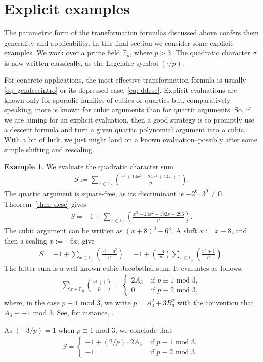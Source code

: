 \documentclass[11pt]{amsart}
\newcommand{\F}{\mathbb{F}}
\newcommand{\Fp}{\F_{\!p}}
\theoremstyle{definition}
\newtheorem{ex}{Example}[section]
\begin{document}
\section{Explicit examples}\label{E}
The parametric form of the transformation formulas discussed above confers them generality and applicability. In this final section we consider some explicit examples. We work over a prime field $\Fp$, where $p>3$. The quadratic character $\sigma$ is now written classically, as the Legendre symbol $(\cdot/p)$. 

For concrete applications, the most effective transformation formula is usually \eqref{eq: gendescintro} or its depressed case, \eqref{eq: ddesc}. Explicit evaluations are known only for sporadic families of cubics or quartics but, comparatively speaking, more is known for cubic arguments than for quartic arguments. So, if we are aiming for an explicit evaluation, then a good strategy is to promptly use a descent formula and turn a given quartic polynomial argument into a cubic. With a bit of luck, we just might land on a known evaluation--possibly after some simple shifting and rescaling.



\begin{ex}\label{ex1}
We evaluate the quadratic character sum
\begin{align}
S:=\sum_{x\in \Fp}\left(\frac{x^4+14x^3+24x^2+14x+1}{p}\right).
\end{align}
The quartic argument is square-free, as its discriminant is $-2^6\cdot 3^9\neq 0$. Theorem~\ref{thm: desc} gives
\begin{align*}
S=-1+\sum_{x\in \Fp}\left(\frac{x^3+24x^2+192x+296}{p}\right).
\end{align*}
The cubic argument can be written as $(x+8)^3-6^3$. A shift $x:=x-8$, and then a scaling $x:=-6x$, give
\begin{align*}
S=-1+\sum_{x\in \Fp}\left(\frac{x^3-6^3}{p}\right)=-1+\left(\frac{-6}{p}\right)\sum_{x\in \Fp}\left(\frac{x^3+1}{p}\right).
\end{align*}
The latter sum is a well-known cubic Jacobsthal sum. It evaluates as follows:
\begin{align*}
\sum_{x\in \Fp} \left(\frac{x^3+1}{p}\right)=
\begin{cases}
2A_3 & \textrm{ if } p\equiv 1 \textrm{ mod } 3,\\
0 & \textrm{ if } p\equiv 2 \textrm{ mod } 3,
\end{cases}
\end{align*}
where, in the case $p\equiv 1$ mod $3$, we write $p=A_3^2+3B_3^2$ with the convention that $A_3\equiv -1$ mod $3$. See, for instance, \cite[Chap.3]{N}.

As $(-3/p)=1$ when $p\equiv 1$ mod $3$, we conclude that
\begin{align}
S=\begin{cases}
-1+ (2/p)\cdot 2A_3 & \textrm{ if } p\equiv 1 \textrm{ mod } 3,\\
-1 & \textrm{ if } p\equiv 2 \textrm{ mod } 3.
\end{cases}
\end{align}
\end{ex}
\end{document}
